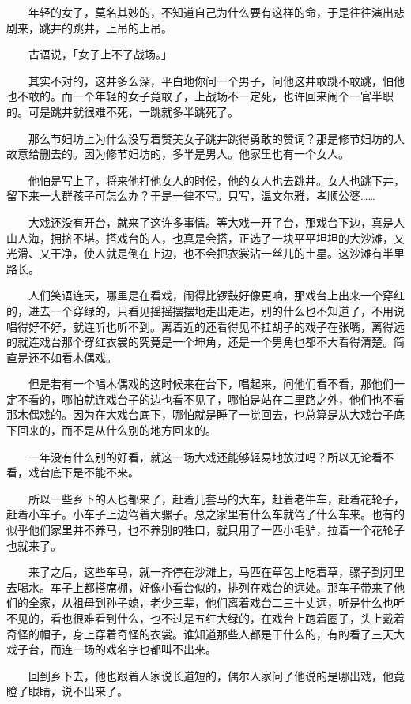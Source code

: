 \documentclass[UTF8]{ctexart}
\begin{document}
　　年轻的女子，莫名其妙的，不知道自己为什么要有这样的命，于是往往演出悲剧来，跳井的跳井，上吊的上吊。

　　古语说，「女子上不了战场。」

　　其实不对的，这井多么深，平白地你问一个男子，问他这井敢跳不敢跳，怕他也不敢的。而一个年轻的女子竟敢了，上战场不一定死，也许回来闹个一官半职的。可是跳井就很难不死，一跳就多半跳死了。

　　那么节妇坊上为什么没写着赞美女子跳井跳得勇敢的赞词？那是修节妇坊的人故意给删去的。因为修节妇坊的，多半是男人。他家里也有一个女人。

　　他怕是写上了，将来他打他女人的时候，他的女人也去跳井。女人也跳下井，留下来一大群孩子可怎么办？于是一律不写。只写，温文尔雅，孝顺公婆……

　　大戏还没有开台，就来了这许多事情。等大戏一开了台，那戏台下边，真是人山人海，拥挤不堪。搭戏台的人，也真是会搭，正选了一块平平坦坦的大沙滩，又光滑、又干净，使人就是倒在上边，也不会把衣裳沾一丝儿的土星。这沙滩有半里路长。

　　人们笑语连天，哪里是在看戏，闹得比锣鼓好像更响，那戏台上出来一个穿红的，进去一个穿绿的，只看见摇摇摆摆地走出走进，别的什么也不知道了，不用说唱得好不好，就连听也听不到。离着近的还看得见不挂胡子的戏子在张嘴，离得远的就连戏台那个穿红衣裳的究竟是一个坤角，还是一个男角也都不大看得清楚。简直是还不如看木偶戏。

　　但是若有一个唱木偶戏的这时候来在台下，唱起来，问他们看不看，那他们一定不看的，哪怕就连戏台子的边也看不见了，哪怕是站在二里路之外，他们也不看那木偶戏的。因为在大戏台底下，哪怕就是睡了一觉回去，也总算是从大戏台子底下回来的，而不是从什么别的地方回来的。

　　一年没有什么别的好看，就这一场大戏还能够轻易地放过吗？所以无论看不看，戏台底下是不能不来。

　　所以一些乡下的人也都来了，赶着几套马的大车，赶着老牛车，赶着花轮子，赶着小车子。小车子上边驾着大骡子。总之家里有什么车就驾了什么车来。也有的似乎他们家里并不养马，也不养别的牲口，就只用了一匹小毛驴，拉着一个花轮子也就来了。

　　来了之后，这些车马，就一齐停在沙滩上，马匹在草包上吃着草，骡子到河里去喝水。车子上都搭席棚，好像小看台似的，排列在戏台的远处。那车子带来了他们的全家，从祖母到孙子媳，老少三辈，他们离着戏台二三十丈远，听是什么也听不见的，看也很难看到什么，也不过是五红大绿的，在戏台上跑着圈子，头上戴着奇怪的帽子，身上穿着奇怪的衣裳。谁知道那些人都是干什么的，有的看了三天大戏子台，而连一场的戏名字也都叫不出来。

　　回到乡下去，他也跟着人家说长道短的，偶尔人家问了他说的是哪出戏，他竟瞪了眼睛，说不出来了。
\end{document}
